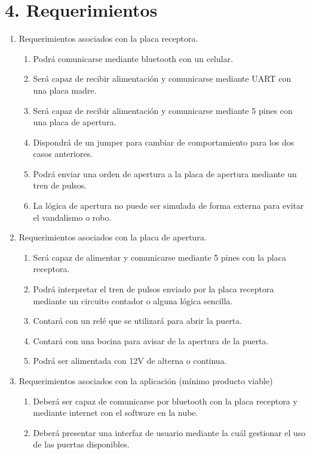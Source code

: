 \documentclass[11pt]{charter}
\begin{document}
\section{4. Requerimientos}
\label{sec:requerimientos}


\begin{enumerate}
\item Requerimientos asociados con la placa receptora.
	\begin{enumerate}
	\item Podrá comunicarse mediante bluetooth con un celular.
	\item Será capaz de recibir alimentación y comunicarse mediante UART con una placa madre.
	\item Será capaz de recibir alimentación y comunicarse mediante 5 pines con una placa de apertura.
	\item Dispondrá de un jumper para cambiar de comportamiento para los dos casos anteriores.
	\item Podrá enviar una orden de apertura a la placa de apertura mediante un tren de pulsos.
	\item La lógica de apertura no puede ser simulada de forma externa para evitar el vandalismo o robo.
	\end{enumerate}
\item Requerimientos asociados con la placa de apertura.
	\begin{enumerate}
	\item Será capaz de alimentar y comunicarse mediante 5 pines con la placa receptora.
	\item Podrá interpretar el tren de pulsos enviado por la placa receptora mediante un circuito contador o alguna lógica sencilla.
	\item Contará con un relé que se utilizará para abrir la puerta.
	\item Contará con una bocina para avisar de la apertura de la puerta.
	\item Podrá ser alimentada con 12V de alterna o continua.
	\end{enumerate}
\item Requerimientos asociados con la aplicación (mínimo producto viable)
	\begin{enumerate}
	\item Deberá ser capaz de comunicarse por bluetooth con la placa receptora y mediante internet con el software en la nube.
	\item Deberá presentar una interfaz de usuario mediante la cuál gestionar el uso de las puertas disponibles.

\end{enumerate}
\end{enumerate}
\end{document}
